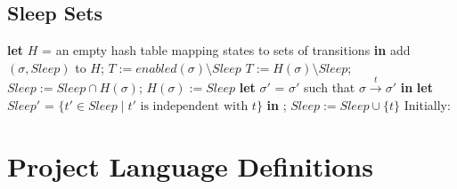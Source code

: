 \documentclass[12pt,a4paper,twoside,openright]{report}
\newcommand{\Let}[2]{\State \textbf{let} #1 = #2 \textbf{in}}
\begin{document}
\section{Sleep Sets}
\label{sapp:sleep-code}
\begin{algorithmic}[1]
	\Let{$H$}{an empty hash table mapping
		states to sets of transitions}
	\State
	\State add $(\sigma, \textit{Sleep})$ to $H$;
	\State$T := \textit{enabled}(\sigma)
	\setminus \textit{Sleep}$
	\Else
	\State$T := H(\sigma) \setminus
	\textit{Sleep}$;
	\State $\textit{Sleep} := \textit{Sleep}
	\cap H(\sigma)$;
	\State $H(\sigma) := \textit{Sleep}$
	\EndIf
	\Let{$\sigma'$}{$\sigma'$ such that
		$\sigma \xrightarrow{t} \sigma'$}
	\Let{$\textit{Sleep}'$}{$\{t' \in \textit{Sleep}
		\mid t' \text{ is independent with } t\}$}
	\State{};
	\State $\textit{Sleep} := \textit{Sleep} \cup \{t\}$
	\EndFor
	\EndProcedure
	\State
	\State Initially: 
\end{algorithmic}

\chapter{Project Language Definitions}
\end{document}
